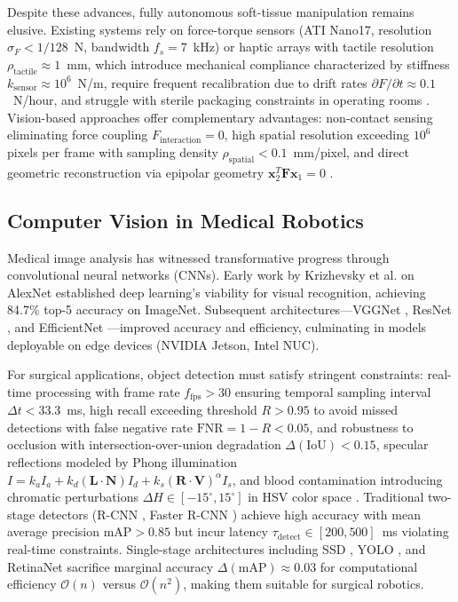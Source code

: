 \documentclass[journal]{IEEEtran}
\begin{document}
Despite these advances, fully autonomous soft-tissue manipulation remains elusive. Existing systems rely on force-torque sensors (ATI Nano17, resolution $\sigma_F < 1/128$~N, bandwidth $f_s = 7$~kHz) \cite{ati2023sensors} or haptic arrays with tactile resolution $\rho_{\text{tactile}} \approx 1$~mm, which introduce mechanical compliance characterized by stiffness $k_{\text{sensor}} \approx 10^6$~N/m, require frequent recalibration due to drift rates $\partial F/\partial t \approx 0.1$~N/hour, and struggle with sterile packaging constraints in operating rooms \cite{okamura2017challenges}. Vision-based approaches offer complementary advantages: non-contact sensing eliminating force coupling $F_{\text{interaction}} = 0$, high spatial resolution exceeding $10^6$ pixels per frame with sampling density $\rho_{\text{spatial}} < 0.1$~mm/pixel, and direct geometric reconstruction via epipolar geometry $\mathbf{x}_2^T \mathbf{F} \mathbf{x}_1 = 0$ \cite{pratt2010autonomous}.

\subsection{Computer Vision in Medical Robotics}

Medical image analysis has witnessed transformative progress through convolutional neural networks (CNNs). Early work by Krizhevsky et al. \cite{krizhevsky2012imagenet} on AlexNet established deep learning's viability for visual recognition, achieving 84.7\% top-5 accuracy on ImageNet. Subsequent architectures---VGGNet \cite{simonyan2014very}, ResNet \cite{he2016deep}, and EfficientNet \cite{tan2019efficientnet}---improved accuracy and efficiency, culminating in models deployable on edge devices (NVIDIA Jetson, Intel NUC).

For surgical applications, object detection must satisfy stringent constraints: real-time processing with frame rate $f_{\text{fps}} > 30$ ensuring temporal sampling interval $\Delta t < 33.3$~ms, high recall exceeding threshold $R > 0.95$ to avoid missed detections with false negative rate $\text{FNR} = 1 - R < 0.05$, and robustness to occlusion with intersection-over-union degradation $\Delta(\text{IoU}) < 0.15$, specular reflections modeled by Phong illumination $I = k_a I_a + k_d (\mathbf{L} \cdot \mathbf{N})I_d + k_s (\mathbf{R} \cdot \mathbf{V})^\alpha I_s$, and blood contamination introducing chromatic perturbations $\Delta H \in [-15^\circ, 15^\circ]$ in HSV color space \cite{bodenstedt2018comparative}. Traditional two-stage detectors (R-CNN \cite{girshick2014rich}, Faster R-CNN \cite{ren2015faster}) achieve high accuracy with mean average precision $\text{mAP} > 0.85$ but incur latency $\tau_{\text{detect}} \in [200, 500]$~ms violating real-time constraints. Single-stage architectures including SSD \cite{liu2016ssd}, YOLO \cite{redmon2016you}, and RetinaNet \cite{lin2017focal} sacrifice marginal accuracy $\Delta(\text{mAP}) \approx 0.03$ for computational efficiency $\mathcal{O}(n)$ versus $\mathcal{O}(n^2)$, making them suitable for surgical robotics.
\end{document}
